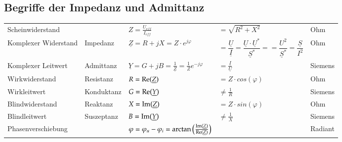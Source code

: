 \subsection{Begriffe der Impedanz und Admittanz}
\begin{tabular}{lllll}
	Scheinwiderstand & & $Z = \frac{U_{eff}}{I_{eff}} $ & $ =
	\sqrt{R^2+X^2}$ & Ohm\\ Komplexer Widerstand & Impedanz & $\underline Z = R + jX = Z \cdot e^{j \varphi}$ 
	& $  = \dfrac{\underline{U}}{\underline{I}} = \dfrac{\underline{U}\cdot\underline{U}^{\ast}}{\underline{S}^*} =  = \dfrac{U^2}{\underline{S}^*} = 
	\dfrac{\underline{S}}{I^2}$ & Ohm\\
	Komplexer Leitwert & Admittanz & $\underline Y = G + jB =
	\frac{1}{\underline Z} = \frac{1}{Z}e^{-j\varphi}$ & $= \frac{\underline{I}}{\underline{U}}$ &  Siemens\\
	Wirkwiderstand & Resistanz & $R = \operatorname{Re}(\underline Z) $ & $ = Z
	\cdot cos(\varphi)$ & Ohm\\
	Wirkleitwert & Konduktanz & $G = \operatorname{Re}(\underline Y) $ & $ \neq \frac{1}{R}$ &
	Siemens\\
	Blindwiderstand & Reaktanz & $X = \operatorname{Im}(\underline Z) $ & $ = Z
	\cdot sin(\varphi)$ & Ohm\\
	Blindleitwert & Suszeptanz & $B = \operatorname{Im}( \underline Y) $ & $ \neq \frac{1}{X}$
	& Siemens\\
	Phasenverschiebung & & $\varphi = \varphi_u - \varphi_i =
	\arctan\left(\frac{\operatorname{Im}(\underline{Z})}{\operatorname{Re}(\underline{Z})}\right)$ & &
	Radiant\\
	
\end{tabular}